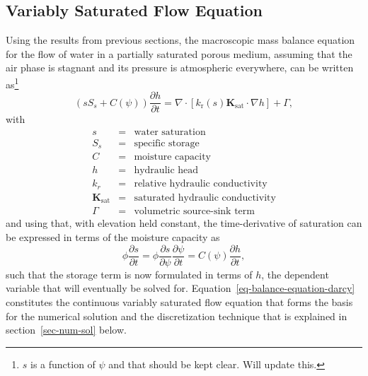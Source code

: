 \documentclass[fleqn]{article}
\begin{document}
\subsection{Variably Saturated Flow Equation}
Using the results from previous sections, the macroscopic mass balance 
equation for the flow of water in a partially saturated porous medium, 
assuming that the air phase is stagnant and its pressure is atmospheric 
everywhere, can be written as\footnote{$s$ is a function of $\psi$ and
that should be kept clear. Will update this.}
\begin{equation}
  \left(s S_s  + C(\psi)\right)\frac{\partial h}{\partial t} =
  \nabla \cdot \left[ 
    k_\text{r}(s) \mathbf{K}_{\textrm{sat}} \cdot \nabla h \right] +
  \Gamma,
  \label{eq-balance-equation-darcy}
\end{equation}
with
\begin{eqnarray*}
  s &=& \text{water saturation} \\
  S_s &=& \text{specific storage} \\
  C &=& \text{moisture capacity} \\
  h &=& \text{hydraulic head} \\
  k_r &=& \text{relative hydraulic conductivity} \\
  \mathbf{K}_{\textrm{sat}} &=& \text{saturated hydraulic conductivity} \\
  \Gamma &=& \text{volumetric source-sink term}
\end{eqnarray*}
and using that, with elevation held constant, the time-derivative 
of saturation can be expressed in terms of the moisture capacity as
\begin{equation}
  \phi \frac{\partial s}{\partial t} = 
  \phi \frac{\partial s}{\partial \psi} \frac{\partial \psi}{\partial t} =
  C(\psi) \frac{\partial h}{\partial t},
\end{equation}
such that the storage term is now formulated in terms of $h$, the
dependent variable that will eventually be solved for. 
Equation~\ref{eq-balance-equation-darcy} constitutes the continuous
variably saturated flow equation that forms the basis for the numerical 
solution and the discretization technique that is explained in 
section~\ref{sec-num-sol} below.
\end{document}
